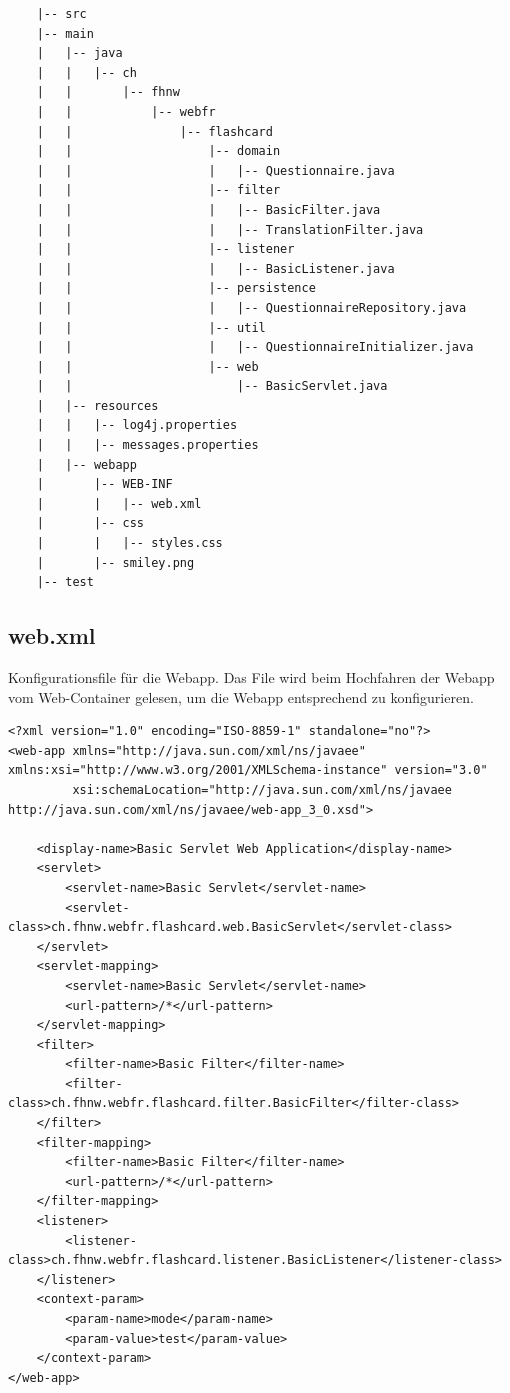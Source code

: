 \begin{verbatim}
    |-- src
    |-- main
    |   |-- java
    |   |   |-- ch
    |   |       |-- fhnw
    |   |           |-- webfr
    |   |               |-- flashcard
    |   |                   |-- domain
    |   |                   |   |-- Questionnaire.java
    |   |                   |-- filter
    |   |                   |   |-- BasicFilter.java
    |   |                   |   |-- TranslationFilter.java
    |   |                   |-- listener
    |   |                   |   |-- BasicListener.java
    |   |                   |-- persistence
    |   |                   |   |-- QuestionnaireRepository.java
    |   |                   |-- util
    |   |                   |   |-- QuestionnaireInitializer.java
    |   |                   |-- web
    |   |                       |-- BasicServlet.java
    |   |-- resources
    |   |   |-- log4j.properties
    |   |   |-- messages.properties
    |   |-- webapp
    |       |-- WEB-INF
    |       |   |-- web.xml
    |       |-- css
    |       |   |-- styles.css
    |       |-- smiley.png
    |-- test
\end{verbatim}
\subsection{web.xml}
Konfigurationsfile für die Webapp. Das File wird beim Hochfahren der Webapp vom Web-Container gelesen, um die Webapp entsprechend zu konfigurieren.
\begin{verbatim}
<?xml version="1.0" encoding="ISO-8859-1" standalone="no"?>
<web-app xmlns="http://java.sun.com/xml/ns/javaee" xmlns:xsi="http://www.w3.org/2001/XMLSchema-instance" version="3.0"
         xsi:schemaLocation="http://java.sun.com/xml/ns/javaee http://java.sun.com/xml/ns/javaee/web-app_3_0.xsd">
 
    <display-name>Basic Servlet Web Application</display-name>
    <servlet>
        <servlet-name>Basic Servlet</servlet-name>
        <servlet-class>ch.fhnw.webfr.flashcard.web.BasicServlet</servlet-class>
    </servlet>
    <servlet-mapping>
        <servlet-name>Basic Servlet</servlet-name>
        <url-pattern>/*</url-pattern>
    </servlet-mapping>
    <filter>
        <filter-name>Basic Filter</filter-name>
        <filter-class>ch.fhnw.webfr.flashcard.filter.BasicFilter</filter-class>
    </filter>
    <filter-mapping>
        <filter-name>Basic Filter</filter-name>
        <url-pattern>/*</url-pattern>
    </filter-mapping>
    <listener>
        <listener-class>ch.fhnw.webfr.flashcard.listener.BasicListener</listener-class>
    </listener>
    <context-param>
        <param-name>mode</param-name>
        <param-value>test</param-value>
    </context-param>
</web-app>
\end{verbatim}
